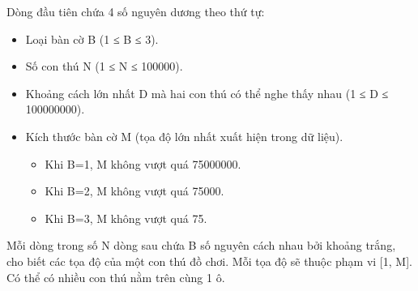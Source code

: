 Dòng đầu tiên chứa 4 số nguyên dương theo thứ tự:  
\begin{itemize}
	\item     Loại bàn cờ B (1 ≤ B ≤ 3).   
	\item     Số con thú N (1 ≤ N ≤ 100000).   
	\item     Khoảng cách lớn nhất D mà hai con thú có thể nghe thấy nhau (1 ≤ D ≤ 100000000).   
	\item     Kích thước bàn cờ M (tọa độ lớn nhất xuất hiện trong dữ liệu).    
\begin{itemize}
	\item       Khi B=1, M không vượt quá 75000000.     
	\item       Khi B=2, M không vượt quá 75000.     
	\item       Khi B=3, M không vượt quá 75.     
\end{itemize}
\end{itemize}

   Mỗi dòng trong số N dòng sau chứa B số nguyên cách nhau bởi khoảng trắng, cho biết các tọa độ của một con thú đồ chơi. Mỗi tọa độ sẽ thuộc phạm vi [1, M]. Có thể có nhiều con thú nằm trên cùng 1 ô.